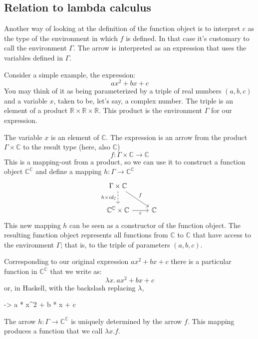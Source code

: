 \documentclass[DaoFP]{subfiles}
\begin{document}
\subsection{Relation to lambda calculus}

Another way of looking at the definition of the function object is to interpret $c$ as the type of the environment in which $f$ is defined. In that case it's customary to call the environment $\Gamma$. The arrow is interpreted as an expression that uses the variables defined in $\Gamma$. 

Consider a simple example, the expression:
\[a x^2 + b x + c\]
You may think of it as being parameterized by a triple of real numbers $(a, b, c)$ and a variable $x$, taken to be, let's say, a complex number. The triple is an element of a product $\mathbb{R} \times \mathbb{R} \times \mathbb{R}$. This product is the environment $\Gamma$ for our expression. 

The variable $x$ is an element of $\mathbb{C}$. The expression is an arrow from the product $\Gamma \times \mathbb{C}$ to the result type (here, also $\mathbb{C}$)
\[f \colon \Gamma \times \mathbb{C} \to \mathbb{C} \]
This is a mapping-out from a product, so we can use it to construct a function object  $\mathbb{C}^{\mathbb{C}}$ and define a mapping $h \colon \Gamma \to \mathbb{C}^{\mathbb{C}}$
\[
 \begin{tikzcd}
 \Gamma \times \mathbb{C}
 \arrow[d, dashed, "h \times id_{\mathbb{C}}"']
 \arrow[rd, "f"]
 \\
 \mathbb{C}^{\mathbb{C}} \times \mathbb{C}
 \arrow[r, "\varepsilon"']
& \mathbb{C}
 \end{tikzcd}
\]
This new mapping $h$ can be seen as a constructor of the function object. The resulting function object represents all functions from $\mathbb{C}$ to $\mathbb{C}$ that have access to the environment $\Gamma$; that is, to the triple of parameters $(a, b, c)$. 

Corresponding to our original expression $a x^2 + b x + c$ there is a particular function in $\mathbb{C}^{\mathbb{C}}$ that we write as:
\[  \lambda x . \,a x^2 + b x + c \]
or, in Haskell, with the backslash replacing $\lambda$,
\begin{haskell}
\x -> a * x^2 + b * x + c
\end{haskell}

The arrow $h \colon \Gamma \to \mathbb{C}^{\mathbb{C}}$ is uniquely determined by the arrow $f$. This mapping produces a function that we call $\lambda x . f$.
\end{document}

